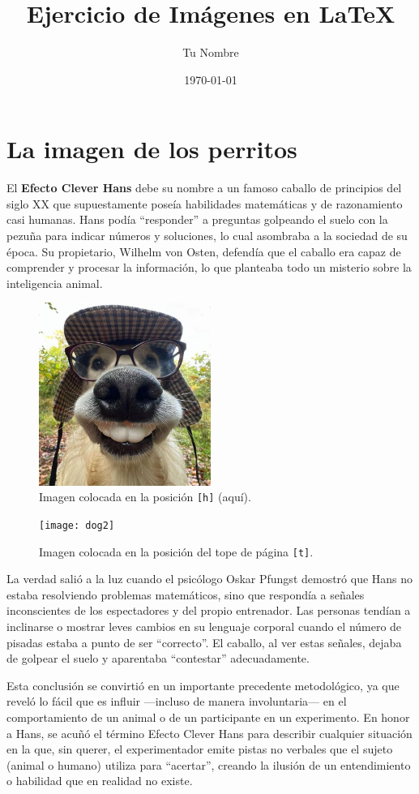 \documentclass[12pt]{article}
\title{Ejercicio de Imágenes en \LaTeX}
\author{Tu Nombre}
\date{\today}
\begin{document}
\maketitle



\section{La imagen de los perritos}

El \textbf{Efecto Clever Hans} debe su nombre a un famoso caballo de principios del siglo XX que supuestamente poseía habilidades matemáticas y de razonamiento casi humanas. Hans podía “responder” a preguntas golpeando el suelo con la pezuña para indicar números y soluciones, lo cual asombraba a la sociedad de su época. Su propietario, Wilhelm von Osten, defendía que el caballo era capaz de comprender y procesar la información, lo que planteaba todo un misterio sobre la inteligencia animal.

\begin{figure}[h] %
    \centering
    \includegraphics[width=0.5\textwidth]{dog1}
    \caption{Imagen colocada en la posición \texttt{[h]} (aquí).}
    \label{fig:h}
\end{figure}


\begin{figure}[t] %
    \centering
    \texttt{[image: dog2]}
    \caption{Imagen colocada en la posición  del tope de página \texttt{[t]}.}
    \label{fig:h}
\end{figure}




La verdad salió a la luz cuando el psicólogo Oskar Pfungst demostró que Hans no estaba resolviendo problemas matemáticos, sino que respondía a señales inconscientes de los espectadores y del propio entrenador. Las personas tendían a inclinarse o mostrar leves cambios en su lenguaje corporal cuando el número de pisadas estaba a punto de ser “correcto”. El caballo, al ver estas señales, dejaba de golpear el suelo y aparentaba “contestar” adecuadamente.

Esta conclusión se convirtió en un importante precedente metodológico, ya que reveló lo fácil que es influir —incluso de manera involuntaria— en el comportamiento de un animal o de un participante en un experimento. En honor a Hans, se acuñó el término Efecto Clever Hans para describir cualquier situación en la que, sin querer, el experimentador emite pistas no verbales que el sujeto (animal o humano) utiliza para “acertar”, creando la ilusión de un entendimiento o habilidad que en realidad no existe.
\end{document}
